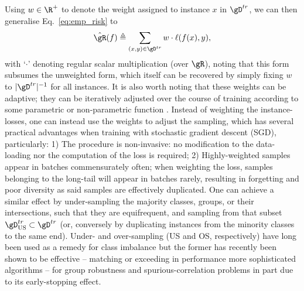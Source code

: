 Using \( w \in \R^+ \) to denote the weight assigned to instance \(x\) in \( \gD^{tr} \), we can
then generalise Eq.~\ref{eq:emp_risk} to
\begin{equation*} \label{eq:emp_risk_weighted}
  \hat{\gR}(f) \triangleq \sum_{(x, y) \in \gD^{tr}} w \cdot \ell (f(x), y),
\end{equation*}
with `\( \cdot \)' denoting regular scalar multiplication (over \(\gR\)), noting that this form
subsumes the unweighted form, which itself can be recovered by simply fixing \(w\) to \(
|\gD^{tr}|^{-1} \) for all instances.
%
It is also worth noting that these weights can be adaptive; they can be iteratively
adjusted over the course of training according to some parametric or non-parametric function
\citep{wang2021importance}.
%
Instead of weighting the instance-losses, one can instead use the weights to adjust the sampling,
which has several practical advantages when training with stochastic gradient descent (SGD),
particularly: 
1) The procedure is non-invasive: no modification to the data-loading nor the
computation of the loss is required;
%
2) Highly-weighted samples appear in batches commensurately often; when weighting the loss, samples
belonging to the long-tail will appear in batches rarely, resulting in forgetting and poor
diversity as said samples are effectively duplicated.
One can achieve a similar effect by under-sampling the majority classes, groups, or their
intersections, such that they are equifrequent, and \iid{} sampling from that subset \(
\gD^{tr}_{\text{US}} \subset \gD^{tr} \) (or, conversely by duplicating instances from the minority
classes to the same end).
Under- and over-sampling (US and OS, respectively) have long been used as a remedy for class imbalance
\citep{chawla2002smote} but the former has recently been shown to be effective -- matching or
exceeding in performance more sophisticated algorithms -- for group robustness and
spurious-correlation problems \citep{sagawa2020investigation, idrissi2022simple} in part due to its
early-stopping effect.

